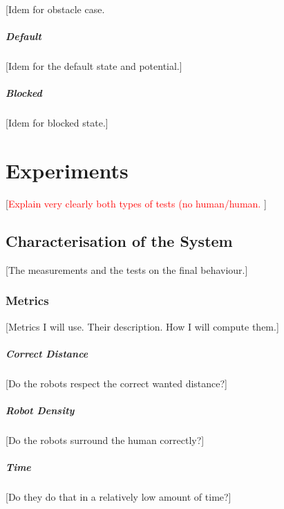 \documentclass[oneside, a4paper, 12pt]{memoir}
\begin{document}
			[Idem for obstacle case.			
						
			\paragraph{Default}
			
			[Idem for the default state and potential.]
			
			\paragraph{Blocked}
			
			[Idem for blocked state.]
		

\chapter{Experiments}
\label{chap:experiments}
[\textcolor{red}{Explain very clearly both types of tests (no human/human.} ]

	\section{Characterisation of the System}
	[The measurements and the tests on the final behaviour.]

		\subsection{Metrics}
		
		[Metrics I will use. Their description. How I will compute them.]
		
			\paragraph{Correct Distance}
			
			[Do the robots respect the correct wanted distance?]
			
			\paragraph{Robot Density}
			
			[Do the robots surround the human correctly?]
			
			\paragraph{Time}
			
			[Do they do that in a relatively low amount of time?]
			
\end{document}
